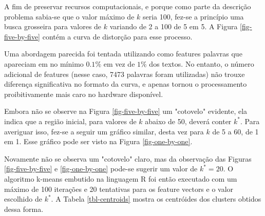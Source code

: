 \documentclass[10pt,twocolumn,letterpaper]{article}
\begin{document}
A fim de preservar recursos computacionais, e porque como parte da descrição problema sabia-se que o valor máximo de $k$ seria 100, fez-se a princípio uma busca grosseira para valores de $k$ variando de 2 a 100 de 5 em 5. A Figura \ref{fig-five-by-five} contém a curva de distorção para esse processo.

 

Uma abordagem parecida foi tentada utilizando como features palavras que apareciam em no mínimo $0.1\%$ em vez de $1\%$ dos textos. No entanto, o número adicional de features (nesse caso, 7473 palavras foram utilizadas) não trouxe diferença significativa no formato da curva, e apenas tornou o processamento proibitivamente mais caro no hardware disponível.

Embora não se observe na Figura \ref{fig-five-by-five} um "cotovelo" evidente, ela indica que a região inicial, para valores de $k$ abaixo de 50, deverá conter $k^{*}$. Para averiguar isso, fez-se a seguir um gráfico similar, desta vez para $k$ de 5 a 60, de 1 em 1. Esse gráfico pode ser visto na Figura \ref{fig-one-by-one}.

Novamente não se observa um "cotovelo" claro, mas da observação das Figuras \ref{fig-five-by-five} e \ref{fig-one-by-one} pode-se sugerir um valor de $k^{*} = 20$. O algoritmo k-means embutido na linguagem R foi então executado com um máximo de 100 iterações e 20 tentativas para os feature vectors e o valor escolhido de $k^{*}$. A Tabela \ref{tbl-centroids} mostra os centróides dos clusters obtidos dessa forma.
\end{document}
